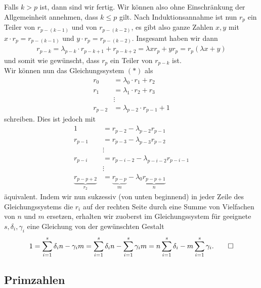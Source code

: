 Falls $k>p$ ist, dann sind wir fertig. Wir können also ohne Einschränkung der Allgemeinheit annehmen, dass $k\leq p$ gilt. Nach Induktionsannahme ist nun $r_p$ ein Teiler von $r_{p-(k-1)}$ und von $r_{p-(k-2)}$, es gibt also ganze Zahlen $x,y$ mit $x\cdot r_p=r_{p-(k-1)}$ und $y\cdot r_p=r_{p-(k-2)}$. Insgesamt haben wir dann
\begin{align*}
	r_{p-k}=\lambda_{p-k}\cdot r_{p-k+1}+r_{p-k+2}=\lambda xr_{p}+yr_{p}=r_{p}(\lambda x+y)
\end{align*}
und somit wie gewünscht, dass $r_p$ ein Teiler von $r_{p-k}$ ist.\\
Wir können nun das Gleichungssystem $(*)$ als
\begin{align*}
	r_0     & =\lambda_0\cdot r_1+r_2       \\
	r_1     & =\lambda_1\cdot r_2+r_3       \\
	        & \vdots                        \\
	r_{p-2} & =\lambda_{p-2}\cdot r_{p-1}+1
\end{align*}
schreiben. Dies ist jedoch mit
\begin{align*}
	1                            & =r_{p-2}-\lambda_{p-2}r_{p-1}                                   \\
	r_{p-1}                      & =r_{p-3}-\lambda_{p-3}r_{p-2}                                   \\
	                             & \vdots                                                          \\
	r_{p-i}                      & =r_{p-i-2}-\lambda_{p-i-2}r_{p-i-1}                             \\
	                             & \vdots                                                          \\
	\underbrace{r_{p-p+2}}_{r_2} & =\underbrace{r_{p-p}}_{m}-\lambda_{0}\underbrace{r_{p-p+1}}_{n}
\end{align*}
äquivalent. Indem wir nun sukzessiv (von unten beginnend) in jeder Zeile des Gleichungssystems die $r_i$ auf der rechten Seite durch eine Summe von Vielfachen von $n$ und $m$ ersetzen, erhalten wir zuoberst im Gleichungssystem für geeignete $s,\delta_i,\gamma_i$ eine Gleichung von der gewünschten Gestalt
\[
	1=\sum_{i=1}^{s}\delta_in-\gamma_im=\sum_{i=1}^{s}\delta_in-\sum_{i=1}^{s}\gamma_im=n\sum_{i=1}^{s}\delta_i-m\sum_{i=1}^{s}\gamma_i.\qedhere
\]

\subsection{Primzahlen}

